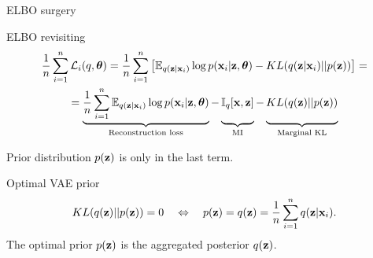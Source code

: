 \begin{frame}{ELBO surgery}
	\begin{block}{ELBO revisiting}
		\vspace{-0.7cm}
		\begin{multline*}
		    \frac{1}{n}\sum_{i=1}^n \cL_i(q, \btheta) = \frac{1}{n} \sum_{i=1}^n \left[ \mathbb{E}_{q(\bz | \bx_i)} \log p(\bx_i | \bz, \btheta) - KL(q(\bz | \bx_i) || p(\bz)) \right] = \\
		    = \underbrace{\frac{1}{n} \sum_{i=1}^n \mathbb{E}_{q(\bz | \bx_i)} \log p(\bx_i | \bz, \btheta)}_{\text{Reconstruction loss}} - \underbrace{\vphantom{ \sum_{i=1}^n} \bbI_q [\bx, \bz]}_{\text{MI}} - \underbrace{\vphantom{ \sum_{i=1}^n} KL(q(\bz) || p(\bz))}_{\text{Marginal KL}}
		\end{multline*}
		\vspace{-0.3cm}
	\end{block}
	Prior distribution $p(\mathbf{z})$ is only in the last term.
	\begin{block}{Optimal VAE prior}
		\vspace{-0.3cm}
		\[
	  		KL(q(\mathbf{z}) || p(\mathbf{z})) = 0 \quad \Leftrightarrow \quad p (\mathbf{z}) = q(\mathbf{z}) = \frac{1}{n} \sum_{i=1}^n q(\mathbf{z} | \mathbf{x}_i).
		\]
		The optimal prior $p(\mathbf{z})$ is the aggregated posterior $q(\mathbf{z})$.
	\end{block}
	
\end{frame}

